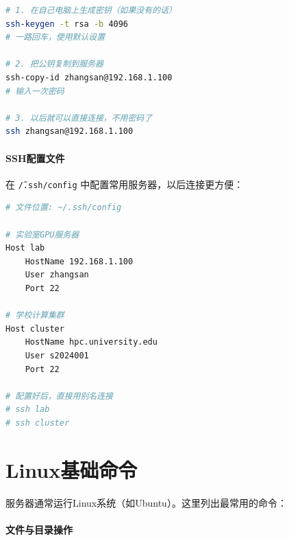 \begin{lstlisting}[language=bash, caption=配置SSH免密登录]
# 1. 在自己电脑上生成密钥（如果没有的话）
ssh-keygen -t rsa -b 4096
# 一路回车，使用默认设置

# 2. 把公钥复制到服务器
ssh-copy-id zhangsan@192.168.1.100
# 输入一次密码

# 3. 以后就可以直接连接，不用密码了
ssh zhangsan@192.168.1.100
\end{lstlisting}

\paragraph{SSH配置文件}

在 \texttt{\~/.ssh/config} 中配置常用服务器，以后连接更方便：

\begin{lstlisting}[language=bash, caption=SSH配置文件示例]
# 文件位置: ~/.ssh/config

# 实验室GPU服务器
Host lab
    HostName 192.168.1.100
    User zhangsan
    Port 22

# 学校计算集群
Host cluster
    HostName hpc.university.edu
    User s2024001
    Port 22

# 配置好后，直接用别名连接
# ssh lab
# ssh cluster
\end{lstlisting}

\section*{Linux基础命令}

服务器通常运行Linux系统（如Ubuntu）。这里列出最常用的命令：

\paragraph{文件与目录操作}\mbox{}\par\nopagebreak

